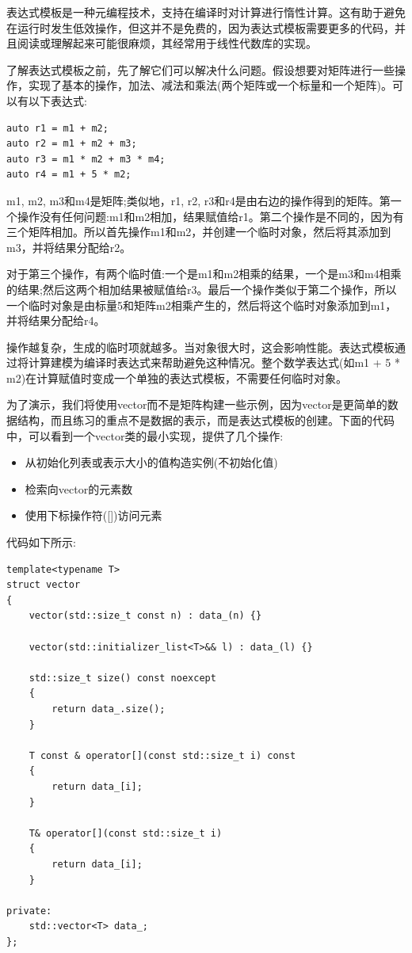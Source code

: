 
表达式模板是一种元编程技术，支持在编译时对计算进行惰性计算。这有助于避免在运行时发生低效操作，但这并不是免费的，因为表达式模板需要更多的代码，并且阅读或理解起来可能很麻烦，其经常用于线性代数库的实现。

了解表达式模板之前，先了解它们可以解决什么问题。假设想要对矩阵进行一些操作，实现了基本的操作，加法、减法和乘法(两个矩阵或一个标量和一个矩阵)。可以有以下表达式:

\begin{lstlisting}[style=styleCXX]
auto r1 = m1 + m2;
auto r2 = m1 + m2 + m3;
auto r3 = m1 * m2 + m3 * m4;
auto r4 = m1 + 5 * m2;
\end{lstlisting}

m1, m2, m3和m4是矩阵;类似地，r1, r2, r3和r4是由右边的操作得到的矩阵。第一个操作没有任何问题:m1和m2相加，结果赋值给r1。第二个操作是不同的，因为有三个矩阵相加。所以首先操作m1和m2，并创建一个临时对象，然后将其添加到m3，并将结果分配给r2。

对于第三个操作，有两个临时值:一个是m1和m2相乘的结果，一个是m3和m4相乘的结果;然后这两个相加结果被赋值给r3。最后一个操作类似于第二个操作，所以一个临时对象是由标量5和矩阵m2相乘产生的，然后将这个临时对象添加到m1，并将结果分配给r4。

操作越复杂，生成的临时项就越多。当对象很大时，这会影响性能。表达式模板通过将计算建模为编译时表达式来帮助避免这种情况。整个数学表达式(如m1 + 5 * m2)在计算赋值时变成一个单独的表达式模板，不需要任何临时对象。

为了演示，我们将使用vector而不是矩阵构建一些示例，因为vector是更简单的数据结构，而且练习的重点不是数据的表示，而是表达式模板的创建。下面的代码中，可以看到一个vector类的最小实现，提供了几个操作:

\begin{itemize}
\item
从初始化列表或表示大小的值构造实例(不初始化值)

\item
检索向vector的元素数

\item
使用下标操作符([])访问元素
\end{itemize}

代码如下所示:

\begin{lstlisting}[style=styleCXX]
template<typename T>
struct vector
{
	vector(std::size_t const n) : data_(n) {}
	
	vector(std::initializer_list<T>&& l) : data_(l) {}
	
	std::size_t size() const noexcept
	{
		return data_.size();
	}

	T const & operator[](const std::size_t i) const
	{
		return data_[i];
	}

	T& operator[](const std::size_t i)
	{
		return data_[i];
	}

private:
	std::vector<T> data_;
};
\end{lstlisting}

